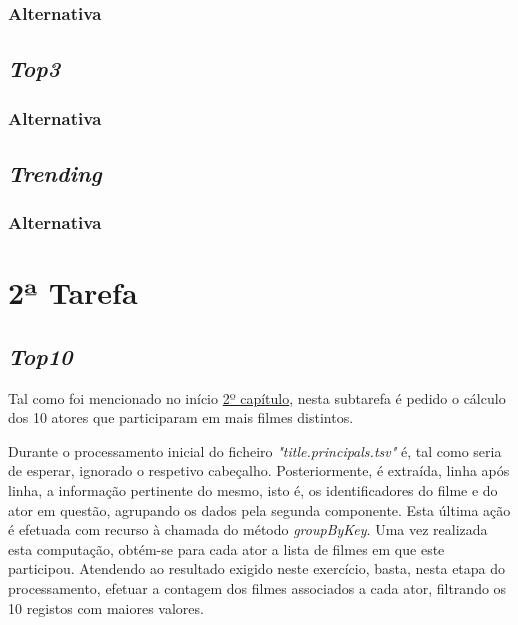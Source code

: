 \documentclass[a4paper]{report}
\begin{document}
            \subsubsection{Alternativa} \label{sssec:Task1-Log-Alternativa}

        \subsection{\textit{Top3}} \label{subsec:Task1-Top3}
            \subsubsection{Alternativa} \label{sssec:Task1-Top3-Alternativa} 

        \subsection{\textit{Trending}} \label{subsec:Task1-Trending}
            \subsubsection{Alternativa} \label{sssec:Task1-Trending-Alternativa}

    \section{2ª Tarefa} \label{sec:Task2}

        \subsection{\textit{Top10}} \label{subsec:Task2-Top10}
            Tal como foi mencionado no início \hyperref[ch:Implementation]{2º capítulo}, nesta subtarefa é pedido o cálculo dos 10 atores que participaram em mais filmes distintos.

            Durante o processamento inicial do ficheiro \textsl{"title.principals.tsv"} é, tal como seria de esperar, ignorado o respetivo cabeçalho.
            Posteriormente, é extraída, linha após linha, a informação pertinente do mesmo, isto é, os identificadores do filme e do ator em questão, agrupando os dados pela segunda componente. Esta última ação é efetuada com recurso à chamada do método \textit{groupByKey}.
            Uma vez realizada esta computação, obtém-se para cada ator a lista de filmes em que este participou. Atendendo ao resultado exigido neste exercício, basta, nesta etapa do processamento, efetuar a contagem dos filmes associados a cada ator, filtrando os 10 registos com maiores valores.
\end{document}
